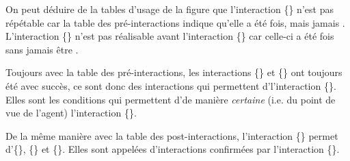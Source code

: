 \documentclass{llncs}
\begin{document}
%



On peut déduire de la tables d'usage de la figure  que l'interaction \{\rondBlanc\} n'est pas répétable car la table des pré-interactions indique qu'elle a été  fois, mais jamais \enacted. 
L'interaction \{\carreBlanc\} n'est pas réalisable avant l'interaction \{\rondBlanc\} car celle-ci a été  fois sans jamais être \enacted. 

Toujours avec la table des pré-interactions, les interactions \{\carreBleu\} et \{\rondBleu\} ont toujours été \enacted avec succès, ce sont donc des interactions qui permettent d'\enact l'interaction \{\rondBlanc\}. Elles sont les conditions qui permettent d'\enact de manière \emph{certaine} (i.e. du point de vue de l'agent) l'interaction \{\rondBlanc\}.

De la même manière avec la table des post-interactions, l'interaction \{\rondBlanc\} permet d'\enact \{\carreBlanc\}, \{\rondBleu\} et \{\triangleBlanc\}. Elles sont appelées d'interactions confirmées par l'interaction \{\rondBlanc\}. 
\end{document}
